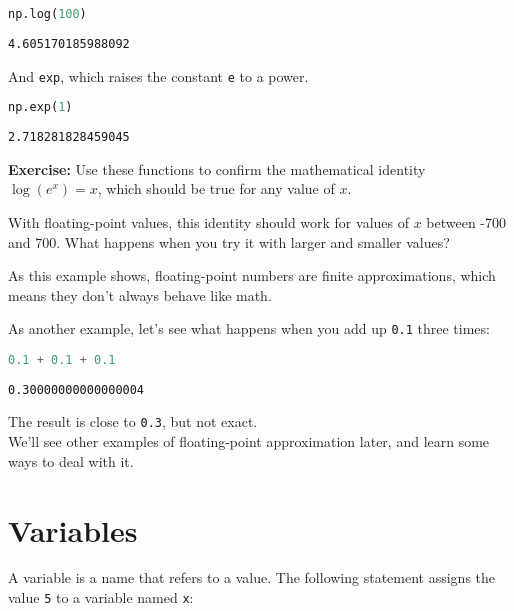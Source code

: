 \begin{lstlisting}[language=Python]
np.log(100)
\end{lstlisting}

\begin{lstlisting}[]
4.605170185988092
\end{lstlisting}

And \passthrough{\lstinline!exp!}, which raises the constant
\passthrough{\lstinline!e!} to a power.

\begin{lstlisting}[language=Python]
np.exp(1)
\end{lstlisting}

\begin{lstlisting}[]
2.718281828459045
\end{lstlisting}

\textbf{Exercise:} Use these functions to confirm the mathematical
identity \(\log(e^x) = x\), which should be true for any value of \(x\).

With floating-point values, this identity should work for values of
\(x\) between -700 and 700. What happens when you try it with larger and
smaller values?

As this example shows, floating-point numbers are finite approximations,
which means they don't always behave like math.

As another example, let's see what happens when you add up
\passthrough{\lstinline!0.1!} three times:

\begin{lstlisting}[language=Python]
0.1 + 0.1 + 0.1
\end{lstlisting}

\begin{lstlisting}[]
0.30000000000000004
\end{lstlisting}

The result is close to \passthrough{\lstinline!0.3!}, but not exact.\\
We'll see other examples of floating-point approximation later, and
learn some ways to deal with it.

\hypertarget{variables}{%
\section{Variables}\label{variables}}

A variable is a name that refers to a value. The following statement
assigns the value \passthrough{\lstinline!5!} to a variable named
\passthrough{\lstinline!x!}:

